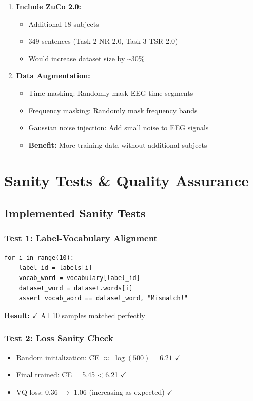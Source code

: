 \documentclass[12pt,a4paper]{article}
\begin{document}
\begin{enumerate}
    \item \textbf{Include ZuCo 2.0:}
    \begin{itemize}
        \item Additional 18 subjects
        \item 349 sentences (Task 2-NR-2.0, Task 3-TSR-2.0)
        \item Would increase dataset size by \textasciitilde30\%
    \end{itemize}
    
    \item \textbf{Data Augmentation:}
    \begin{itemize}
        \item Time masking: Randomly mask EEG time segments
        \item Frequency masking: Randomly mask frequency bands
        \item Gaussian noise injection: Add small noise to EEG signals
        \item \textbf{Benefit:} More training data without additional subjects
    \end{itemize}
\end{enumerate}

\section{Sanity Tests \& Quality Assurance}

\subsection{Implemented Sanity Tests}

\subsubsection{Test 1: Label-Vocabulary Alignment}
\begin{lstlisting}[caption=Data Verification]
for i in range(10):
    label_id = labels[i]
    vocab_word = vocabulary[label_id]
    dataset_word = dataset.words[i]
    assert vocab_word == dataset_word, "Mismatch!"
\end{lstlisting}

\textbf{Result:} $\checkmark$ All 10 samples matched perfectly

\subsubsection{Test 2: Loss Sanity Check}
\begin{itemize}
    \item Random initialization: CE $\approx$ $\log(500) = 6.21$ $\checkmark$
    \item Final trained: CE = 5.45 < 6.21 $\checkmark$
    \item VQ loss: 0.36 $\rightarrow$ 1.06 (increasing as expected) $\checkmark$
\end{itemize}
\end{document}
